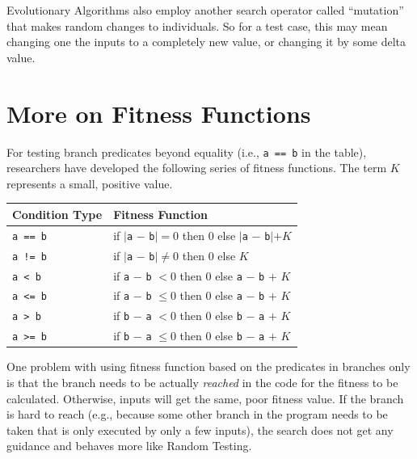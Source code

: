 
Evolutionary Algorithms also employ another search operator called ``mutation''
that makes random changes to individuals. So for a test case, this may mean
changing one the inputs to a completely new value, or changing it by some delta
value. 


\section{More on Fitness Functions}

For testing branch predicates beyond equality (i.e., {\tt a == b} in the table),
researchers have developed the following series of fitness functions. The term
$K$ represents a small, positive value.

\begin{center}
    \begin{tabular}{ll}
        \toprule
        {\bf Condition Type} & {\bf Fitness Function} \\
        \midrule
        {\tt a == b} & if $|${\tt a} $-$ {\tt b}$| = 0$ then $0$ else $|${\tt a} $-$ {\tt b}$| + K$ \\
        {\tt a != b} & if $|${\tt a} $-$ {\tt b}$| \neq 0$ then $0$ else $K$ \\
        {\tt a < b}  & if {\tt a} $-$ {\tt b} $< 0$ then $0$ else {\tt a} $-$ {\tt b} $+$ $K$ \\
        {\tt a <= b} & if {\tt a} $-$ {\tt b} $\leq 0$ then $0$ else {\tt a} $-$ {\tt b} $+$ $K$ \\
        {\tt a > b}  & if {\tt b} $-$ {\tt a} $< 0$ then $0$ else {\tt b} $-$ {\tt a} $+$ $K$ \\
        {\tt a >= b} & if {\tt b} $-$ {\tt a} $\leq 0$ then $0$ else {\tt b} $-$ {\tt a} $+$ $K$ \\
        \bottomrule
    \end{tabular}
\end{center}    
    
One problem with using fitness function based on the predicates in branches only
is that the branch needs to be actually {\it reached} in the code for the
fitness to be calculated. Otherwise, inputs will get the same, poor fitness
value. If the branch is hard to reach (e.g., because some other branch in the
program needs to be taken that is only executed by only a few inputs), the
search does not get any guidance and behaves more like Random Testing.

